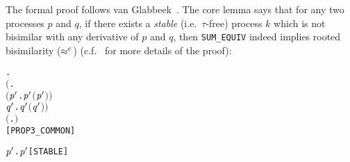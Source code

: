 The formal proof follows van
Glabbeek~\cite{van2005characterisation}.
The core lemma says that for
any two processes $p$ and $q$, if there exists a \emph{stable} (i.e.~$\tau$-free)
 process $k$ which is not bisimilar with any derivative of $p$ and
 $q$, then \texttt{SUM_EQUIV} indeed implies rooted bisimilarity
 ($\mathrel{\approx^{\rm{c}}}$) (c.f.~\cite{Tian:2017wrba} for more details of the proof):
\begin{alltt}
\HOLTokenTurnstile{} \HOLSymConst{\HOLTokenForall{}} .
       \ensuremath{(}\HOLSymConst{\HOLTokenExists{}}.
              \HOLSymConst{\HOLTokenConj{}} \ensuremath{(}\HOLSymConst{\HOLTokenForall{}}\ensuremath{\HOLBoundVar{p}\sp{\prime}} .  \HOLTokenWeakTransBegin{}\HOLTokenWeakTransEnd \ensuremath{\HOLBoundVar{p}\sp{\prime}} \HOLSymConst{\HOLTokenImp{}} \HOLSymConst{\HOLTokenNeg{}}\ensuremath{(}\ensuremath{\HOLBoundVar{p}\sp{\prime}} \HOLSymConst{\HOLTokenWeakEQ} \ensuremath{)}\ensuremath{)} \HOLSymConst{\HOLTokenConj{}}
            \HOLSymConst{\HOLTokenForall{}}\ensuremath{\HOLBoundVar{q}\sp{\prime}} .  \HOLTokenWeakTransBegin{}\HOLTokenWeakTransEnd \ensuremath{\HOLBoundVar{q}\sp{\prime}} \HOLSymConst{\HOLTokenImp{}} \HOLSymConst{\HOLTokenNeg{}}\ensuremath{(}\ensuremath{\HOLBoundVar{q}\sp{\prime}} \HOLSymConst{\HOLTokenWeakEQ} \ensuremath{)}\ensuremath{)} \HOLSymConst{\HOLTokenImp{}}
       \ensuremath{(}\HOLSymConst{\HOLTokenForall{}}.  \HOLSymConst{\ensuremath{+}}  \HOLSymConst{\HOLTokenWeakEQ}  \HOLSymConst{\ensuremath{+}} \ensuremath{)} \HOLSymConst{\HOLTokenImp{}}
        \HOLSymConst{\HOLTokenObsCongr} \hfill{[PROP3_COMMON]}
\end{alltt}
\begin{alltt}
     \HOLTokenDefEquality{} \HOLSymConst{\HOLTokenForall{}} \ensuremath{\HOLBoundVar{p}\sp{\prime}}.  \HOLTokenTransBegin{}\HOLTokenTransEnd \ensuremath{\HOLBoundVar{p}\sp{\prime}} \HOLSymConst{\HOLTokenImp{}}  \HOLSymConst{\HOLTokenNotEqual{}} \HOLSymConst{\ensuremath{\tau}}\hfill{[STABLE]}
\end{alltt}

